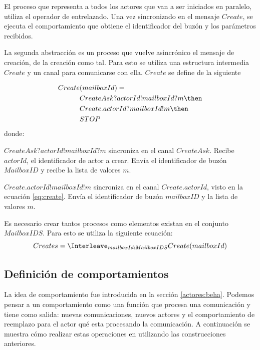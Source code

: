 
El proceso que representa a todos los actores que van a ser iniciados en paralelo, utiliza el operador de entrelazado. Una vez sincronizado en el mensaje $Create$, se ejecuta el comportamiento que obtiene el identificador del buzón y los parámetros recibidos. 

La segunda abstracción es un proceso que vuelve asincrónico el mensaje de creación, de la creación como tal. Para esto se utiliza una estructura intermedia $Create$ y un canal para comunicarse con ella. $Create$ se define de la siguiente 

\begin{equation}\label{eq:create}
\begin{split}
Create&(mailboxId) = \\
&CreateAsk?actorId!mailboxId?m \then \\
&Create.actorId?mailboxId!m \then \\
&STOP
\end{split}
\end{equation}
donde:
\begin{description}
 \item $CreateAsk?actorId!mailboxId?m$ sincroniza en el canal $CreateAsk$. Recibe $actorId$, el identificador de actor a crear. Envía el identificador de buzón $MailboxID$ y recibe la lista de valores $m$.
 \item $Create.actorId!mailboxId!m$ sincroniza en el canal $Create.actorId$, visto en la ecuación \eqref{eq:create}. Envía el identificador de buzón $mailboxID$ y la lista de valores $m$.

\end{description}
Es necesario crear tantos procesos como elementos existan en el conjunto $MailboxIDS$. Para esto se utiliza la siguiente ecuación:
\begin{equation}\label{eq:creates}
Creates = \Interleave_{mailboxId : MailboxIDS} Create(mailboxId)
\end{equation}

\subsection{Definición de comportamientos}
La idea de comportamiento fue introducida en la sección \ref{actores:beha}. Podemos pensar a un comportamiento como una función que procesa una comunicación y tiene como salida: nuevas comunicaciones, nuevos actores y el comportamiento de reemplazo para el actor qué esta procesando la comunicación. A continuación se muestra cómo realizar estas operaciones en \CSP utilizando las construcciones anteriores.

